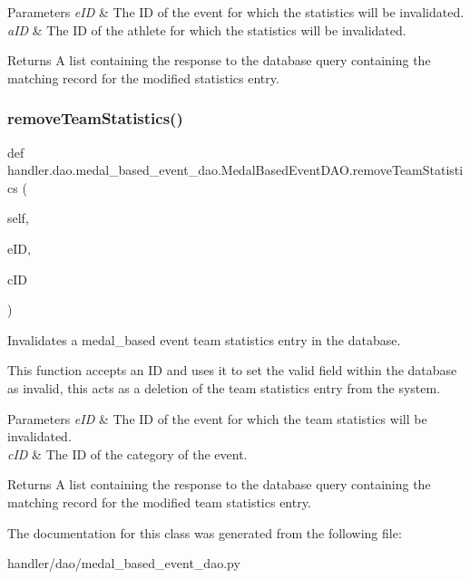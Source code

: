 \begin{DoxyParams}{Parameters}
{\em e\+ID} & The ID of the event for which the statistics will be invalidated. \\
\hline
{\em a\+ID} & The ID of the athlete for which the statistics will be invalidated.\\
\hline
\end{DoxyParams}
\begin{DoxyReturn}{Returns}
A list containing the response to the database query containing the matching record for the modified statistics entry. 
\end{DoxyReturn}
\mbox{\label{classhandler_1_1dao_1_1medal__based__event__dao_1_1_medal_based_event_d_a_o_a4b9d007df7bae642221ffb3a3655206a}} 
\subsubsection{\texorpdfstring{remove\+Team\+Statistics()}{removeTeamStatistics()}}
{\footnotesize\ttfamily def handler.\+dao.\+medal\+\_\+based\+\_\+event\+\_\+dao.\+Medal\+Based\+Event\+D\+A\+O.\+remove\+Team\+Statistics (\begin{DoxyParamCaption}\item[{}]{self,  }\item[{}]{e\+ID,  }\item[{}]{c\+ID }\end{DoxyParamCaption})}



Invalidates a medal\+\_\+based event team statistics entry in the database. 

This function accepts an ID and uses it to set the valid field within the database as invalid, this acts as a deletion of the team statistics entry from the system.


\begin{DoxyParams}{Parameters}
{\em e\+ID} & The ID of the event for which the team statistics will be invalidated. \\
\hline
{\em c\+ID} & The ID of the category of the event.\\
\hline
\end{DoxyParams}
\begin{DoxyReturn}{Returns}
A list containing the response to the database query containing the matching record for the modified team statistics entry. 
\end{DoxyReturn}


The documentation for this class was generated from the following file\+:\begin{DoxyCompactItemize}
\item 
handler/dao/medal\+\_\+based\+\_\+event\+\_\+dao.\+py\end{DoxyCompactItemize}
